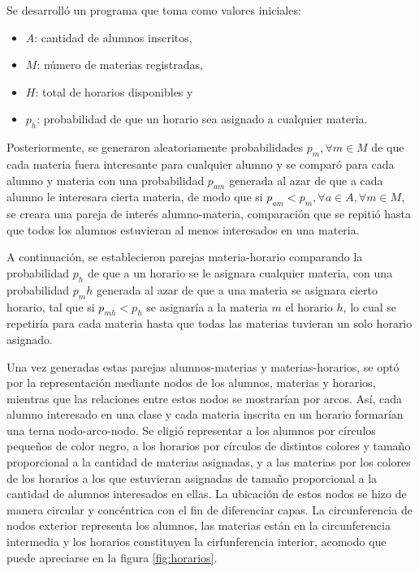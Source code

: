 \documentclass{article}
\begin{document}
  Se desarrolló un programa que toma como valores iniciales:

  \begin{itemize}
    \item $A$: cantidad de alumnos inscritos,
    \item $M$: número de materias registradas,
    \item $H$: total de horarios disponibles y
    \item $p_h$: probabilidad de que un horario sea asignado a cualquier materia.
  \end{itemize}

  Posteriormente, se generaron aleatoriamente probabilidades $p_m, \forall m \in M$ de que cada materia fuera interesante para cualquier alumno y se comparó para cada alumno y materia con una probabilidad $p_{am}$ generada al azar de que a cada alumno le interesara cierta materia, de modo que si $p_{am} < p_m, \forall a \in A, \forall m \in M$, se creara una pareja de interés alumno-materia, comparación que se repitió hasta que todos los alumnos estuvieran al menos interesados en una materia.

  A continuación, se establecieron parejas materia-horario comparando la probabilidad $p_h$ de que a un horario se le asignara cualquier materia,  con una probabilidad $p_mh$ generada al azar de que a una materia se asignara cierto horario, tal que si $p_{mh} < p_h$ se asignaría a la materia $m$ el horario $h$, lo cual se repetiría para cada materia hasta que todas las materias tuvieran un solo horario asignado.

  Una vez generadas estas parejas alumnos-materias y materias-horarios, se optó por la representación mediante nodos de los alumnos, materias y horarios, mientras que las relaciones entre estos nodos se mostrarían por arcos. Así, cada alumno interesado en una clase y cada materia inscrita en un horario formarían una terna nodo-arco-nodo. Se eligió representar a los alumnos por círculos pequeños de color negro, a los horarios por círculos de distintos colores y tamaño proporcional a la cantidad de materias asignadas, y a las materias por los colores de los horarios a los que estuvieran asignadas de tamaño proporcional a la cantidad de alumnos interesados en ellas. La ubicación de estos nodos se hizo de manera circular y concéntrica con el fin de diferenciar capas. La circunferencia de nodos exterior representa los alumnos, las materias están en la circunferencia intermedia y los horarios constituyen la cirfunferencia interior, acomodo que puede apreciarse en la figura \ref{fig:horarios}.
\end{document}
